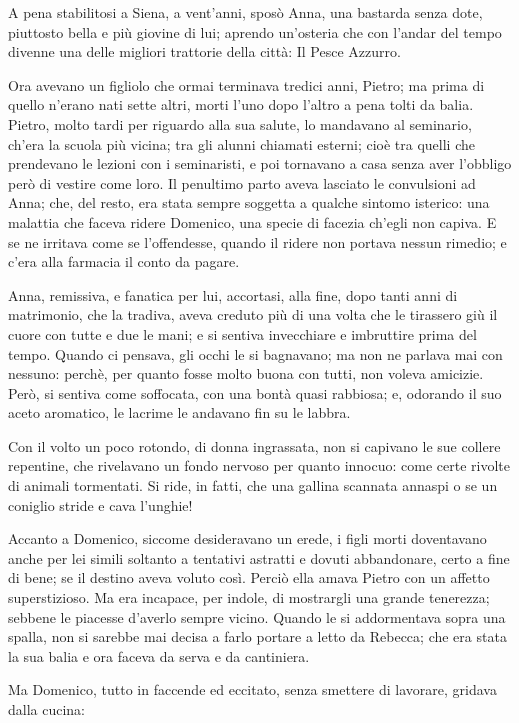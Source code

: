 A pena stabilitosi a Siena, a vent’anni, sposò Anna, una bastarda senza dote, piuttosto bella e più giovine di lui; aprendo un’osteria che con l’andar del tempo divenne una delle migliori trattorie della città: Il Pesce Azzurro.

Ora avevano un figliolo che ormai terminava tredici anni, Pietro; ma prima di quello n’erano nati sette altri, morti l’uno dopo l’altro a pena tolti da balia. Pietro, molto tardi per riguardo alla sua salute, lo mandavano al seminario, ch’era la scuola più vicina; tra gli alunni chiamati esterni; cioè tra quelli che prendevano le lezioni con i seminaristi, e poi tornavano a casa senza aver l’obbligo però di vestire come loro. Il penultimo parto aveva lasciato le convulsioni ad Anna; che, del resto, era stata sempre soggetta a qualche sintomo isterico: una malattia che faceva ridere Domenico, una specie di facezia ch’egli non capiva. E se ne irritava come se l’offendesse, quando il ridere non portava nessun rimedio; e c’era alla farmacia il conto da pagare.

Anna, remissiva, e fanatica per lui, accortasi, alla fine, dopo tanti anni di matrimonio, che la tradiva, aveva creduto più di una volta che le tirassero giù il cuore con tutte e due le mani; e si sentiva invecchiare e imbruttire prima del tempo. Quando ci pensava, gli occhi le si bagnavano; ma non ne parlava mai con nessuno: perchè, per quanto fosse molto buona con tutti, non voleva amicizie. Però, si sentiva come soffocata, con una bontà quasi rabbiosa; e, odorando il suo aceto aromatico, le lacrime le andavano fin su le labbra.

Con il volto un poco rotondo, di donna ingrassata, non si capivano le sue collere repentine, che rivelavano un fondo nervoso per quanto innocuo: come certe rivolte di animali tormentati. Si ride, in fatti, che una gallina scannata annaspi o se un coniglio stride e cava l'unghie!

Accanto a Domenico, siccome desideravano un erede, i figli morti doventavano anche per lei simili soltanto a tentativi astratti e dovuti abbandonare, certo a fine di bene; se il destino aveva voluto così. Perciò ella amava Pietro con un affetto superstizioso. Ma era incapace, per indole, di mostrargli una grande tenerezza; sebbene le piacesse d'averlo sempre vicino. Quando le si addormentava sopra una spalla, non si sarebbe mai decisa a farlo portare a letto da Rebecca; che era stata la sua balia e ora faceva da serva e da cantiniera.

Ma Domenico, tutto in faccende ed eccitato, senza smettere di lavorare, gridava dalla cucina:

